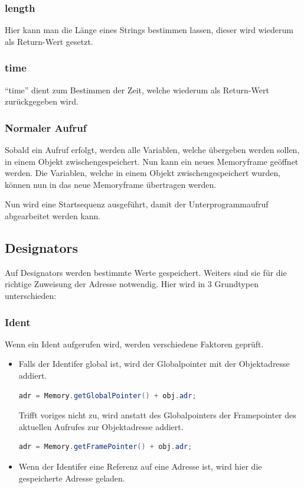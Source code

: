 \subsubsection{length}
Hier kann man die Länge eines Strings bestimmen lassen, dieser wird wiederum als Return-Wert gesetzt.

\subsubsection{time}
``time'' dient zum Bestimmen der Zeit, welche wiederum als Return-Wert zurückgegeben wird.

\subsubsection{Normaler Aufruf}
Sobald ein Aufruf erfolgt, werden alle Variablen, welche übergeben werden sollen, in einem Objekt zwischengespeichert. Nun kann ein
neues Memoryframe geöffnet werden. Die Variablen, welche in einem Objekt zwischengespeichert wurden, können nun in das neue
Memoryframe übertragen werden.

Nun wird eine Startsequenz ausgeführt, damit der Unterprogrammaufruf abgearbeitet werden kann.

\subsection{Designators}
Auf Designators werden bestimmte Werte gespeichert. Weiters sind sie für die richtige Zuweisung der Adresse notwendig.
Hier wird in 3 Grundtypen unterschieden:

\subsubsection{Ident}
Wenn ein Ident aufgerufen wird, werden verschiedene Faktoren geprüft.
\begin{itemize}
 \item Falls der Identifer global ist, wird der Globalpointer mit der Objektadresse addiert.
 \begin{lstlisting}[language=JAVA]
 adr = Memory.getGlobalPointer() + obj.adr;	
  \end{lstlisting}
  Trifft voriges nicht zu, wird anstatt des Globalpointers der Framepointer des aktuellen Aufrufes zur Objektadresse addiert.
   \begin{lstlisting}[language=JAVA]
 adr = Memory.getFramePointer() + obj.adr;
  \end{lstlisting}
 \item Wenn der Identifer eine Referenz auf eine Adresse ist, wird hier die gespeicherte Adresse geladen.
\end{itemize}




